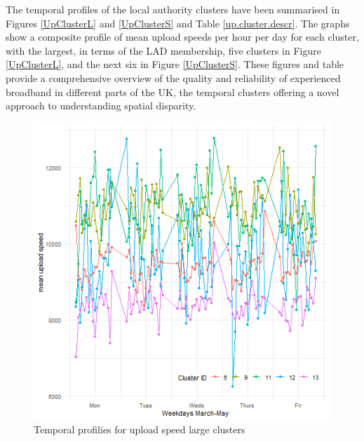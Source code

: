 \documentclass[]{interact}
\theoremstyle{plain}%
\theoremstyle{definition}
\theoremstyle{remark}
\begin{document}
The temporal profiles of the local authority clusters have been
summarised in Figures \ref{UpClusterL} and \ref{UpClusterS} and Table
\ref{up.cluster.descr}. The graphs show a composite profile of mean
upload speeds per hour per day for each cluster, with the largest, in
terms of the LAD membership, five clusters in Figure \ref{UpClusterL},
and the next six in Figure \ref{UpClusterS}. These figures and table
provide a comprehensive overview of the quality and reliability of
experienced broadband in different parts of the UK, the temporal
clusters offering a novel approach to understanding spatial disparity.

\begin{figure}
\includegraphics[width=0.95\linewidth]{figures/upClusterL} \caption{\label{UpClusterL}Temporal profilies for upload speed large clusters}\label{fig:unnamed-chunk-2}
\end{figure}
\end{document}
